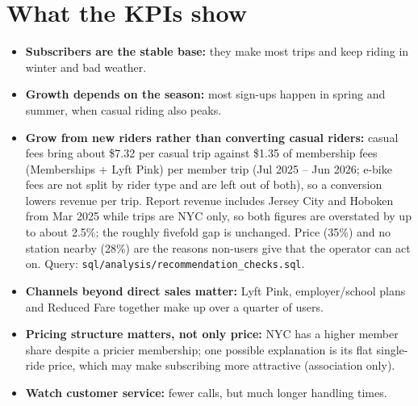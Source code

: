 \documentclass[11pt,a4paper]{article}
\newcommand{\f}[1]{\texttt{\small #1}}
\begin{document}
\section{What the KPIs show}
\begin{itemize}
\item \textbf{Subscribers are the stable base:} they make most trips and keep riding in winter and bad weather.
\item \textbf{Growth depends on the season:} most sign-ups happen in spring and summer, when casual riding also peaks.
\item \textbf{Grow from new riders rather than converting casual riders:} casual fees bring about \$7.32 per casual trip against \$1.35 of membership fees (Memberships + Lyft Pink) per member trip (Jul 2025 -- Jun 2026; e-bike fees are not split by rider type and are left out of both), so a conversion lowers revenue per trip. Report revenue includes Jersey City and Hoboken from Mar 2025 while trips are NYC only, so both figures are overstated by up to about 2.5\%; the roughly fivefold gap is unchanged. Price (35\%) and no station nearby (28\%) are the reasons non-users give that the operator can act on. Query: \f{sql/analysis/recommendation\_checks.sql}.
\item \textbf{Channels beyond direct sales matter:} Lyft Pink, employer/school plans and Reduced Fare together make up over a quarter of users.
\item \textbf{Pricing structure matters, not only price:} NYC has a higher member share despite a pricier membership; one possible explanation is its flat single-ride price, which may make subscribing more attractive (association only).
\item \textbf{Watch customer service:} fewer calls, but much longer handling times.
\end{itemize}
\end{document}

